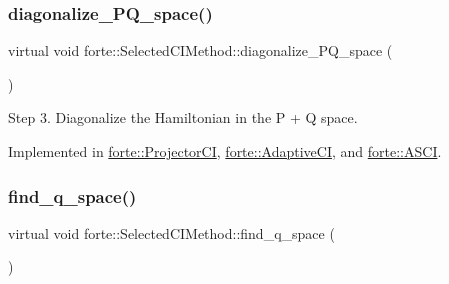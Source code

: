 \mbox{\label{classforte_1_1_selected_c_i_method_a9f01588d22401cd2631a09940ea7db50}} 
\subsubsection{\texorpdfstring{diagonalize\+\_\+\+P\+Q\+\_\+space()}{diagonalize\_PQ\_space()}}
{\footnotesize\ttfamily virtual void forte\+::\+Selected\+C\+I\+Method\+::diagonalize\+\_\+\+P\+Q\+\_\+space (\begin{DoxyParamCaption}{ }\end{DoxyParamCaption})\hspace{0.3cm}{\ttfamily [pure virtual]}}



Step 3. Diagonalize the Hamiltonian in the P + Q space. 



Implemented in \mbox{\hyperlink{classforte_1_1_projector_c_i_ae61e5b098015659c30198655fe0b2679}{forte\+::\+Projector\+CI}}, \mbox{\hyperlink{classforte_1_1_adaptive_c_i_a307427ce58102e4a818b2e97583e2ac1}{forte\+::\+Adaptive\+CI}}, and \mbox{\hyperlink{classforte_1_1_a_s_c_i_aa285dc9063075f23a7a1f4a1513c8aac}{forte\+::\+A\+S\+CI}}.

\mbox{\label{classforte_1_1_selected_c_i_method_aff521efa08edfafb479f32e03a70c118}} 
\subsubsection{\texorpdfstring{find\+\_\+q\+\_\+space()}{find\_q\_space()}}
{\footnotesize\ttfamily virtual void forte\+::\+Selected\+C\+I\+Method\+::find\+\_\+q\+\_\+space (\begin{DoxyParamCaption}{ }\end{DoxyParamCaption})\hspace{0.3cm}{\ttfamily [pure virtual]}}



